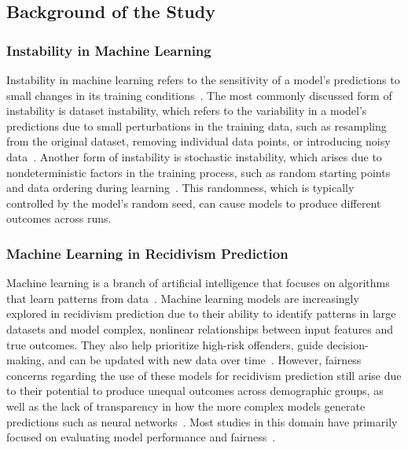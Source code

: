 \documentclass{article}
\begin{document}
\newpage
\subsection{Background of the Study}
\subsubsection*{Instability in Machine Learning} %
\tab%
Instability in machine learning refers to the sensitivity of a model's predictions to small changes in its training conditions~\cite{sun2015stability}. The most commonly discussed form of instability is dataset instability, which refers to the variability in a model's predictions due to small perturbations in the training data, such as resampling from the original dataset, removing individual data points, or introducing noisy data~\cite{riley2023stability,hardt2016train}. Another form of instability is stochastic instability, which arises due to nondeterministic factors in the training process, such as random starting points and data ordering during learning~\cite{lopez2022instability}. This randomness, which is typically controlled by the model's random seed, can cause models to produce different outcomes across runs.

\subsubsection*{Machine Learning in Recidivism Prediction} %
\tab%
Machine learning is a branch of artificial intelligence that focuses on algorithms that learn patterns from data~\cite{duwe2017out}. Machine learning models are increasingly explored in recidivism prediction due to their ability to identify patterns in large datasets and model complex, nonlinear relationships between input features and true outcomes. They also help prioritize high-risk offenders, guide decision-making, and can be updated with new data over time~\cite{ozkan2017predicting, karimi2021enhancing}. However, fairness concerns regarding the use of these models for recidivism prediction still arise due to their potential to produce unequal outcomes across demographic groups, as well as the lack of transparency in how the more complex models generate predictions such as neural networks~\cite{dressel2018accuracy, tolan2019machine}. Most studies in this domain have primarily focused on evaluating model performance and fairness~\cite{travaini2022machine, tolan2019machine}.
\end{document}
